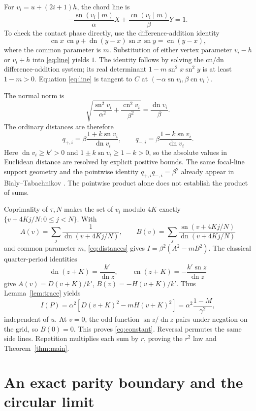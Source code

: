 \documentclass[11pt]{article}
\newcommand{\sn}{\operatorname{sn}}
\newcommand{\cn}{\operatorname{cn}}
\newcommand{\dn}{\operatorname{dn}}
\begin{document}
For \(v_i=u+(2i+1)h\), the chord line is
\begin{equation}\label{eq:line}
 -\frac{\sn(v_i\mid m)}\alpha X+
  \frac{\cn(v_i\mid m)}\beta Y=1.
\end{equation}
To check the contact phase directly, use the difference-addition identity
\[
 \cn x\,\cn y+\dn(y-x)\sn x\,\sn y=\cn(y-x),
\]
where the common parameter is \(m\). Substitution of either vertex
parameter \(v_i-h\) or \(v_i+h\) into \eqref{eq:line} yields \(1\).
The identity follows by solving the cn/dn difference-addition system;
its real determinant \(1-m\sn^2x\sn^2y\) is at least \(1-m>0\).
Equation \eqref{eq:line} is tangent to \(C\) at
\((-\alpha\sn v_i,\beta\cn v_i)\).

The normal norm is
\[
 \sqrt{\frac{\sn^2v_i}{\alpha^2}+\frac{\cn^2v_i}{\beta^2}}
     =\frac{\dn v_i}\beta.
\]
The ordinary distances are therefore
\begin{equation}\label{eq:distances}
 q_{+,i}=\beta\frac{1+k\sn v_i}{\dn v_i},\qquad
 q_{-,i}=\beta\frac{1-k\sn v_i}{\dn v_i}.
\end{equation}
Here \(\dn v_i\geq k'>0\) and \(1\pm k\sn v_i\geq1-k>0\), so
the absolute values in Euclidean distance are resolved by explicit
positive bounds. The same focal-line support geometry and the
pointwise identity \(q_{+,i}q_{-,i}=\beta^2\) already appear in
Bialy--Tabachnikov \cite[Lemma~4.2]{BT}. The pointwise product alone
does not establish the product of sums.

Coprimality of \(\tau,N\) makes the set of \(v_i\) modulo \(4K\)
exactly \(\{v+4Kj/N:0\leq j<N\}\). With
\[
 A(v)=\sum_j\frac1{\dn(v+4Kj/N)},\qquad
 B(v)=\sum_j\frac{\sn(v+4Kj/N)}{\dn(v+4Kj/N)}
\]
and common parameter \(m\), \eqref{eq:distances} gives
\(I=\beta^2(A^2-mB^2)\).
The classical quarter-period identities
\[
 \dn(z+K)=\frac{k'}{\dn z},\qquad
 \cn(z+K)=-\frac{k'\sn z}{\dn z}
\]
give \(A(v)=D(v+K)/k'\), \(B(v)=-H(v+K)/k'\).
Thus Lemma~\ref{lem:trace} yields
\[
 I(P)=\alpha^2[D(v+K)^2-mH(v+K)^2]
      =\alpha^2\frac{1-M}{\gamma^2},
\]
independent of \(u\).
At \(v=0\), the odd function \(\sn z/\dn z\) pairs under negation
on the grid, so \(B(0)=0\). This proves \eqref{eq:constant}.
Reversal permutes the same side lines. Repetition multiplies each
sum by \(r\), proving the \(r^2\) law and Theorem~\ref{thm:main}.

\section{An exact parity boundary and the circular limit}
\end{document}

